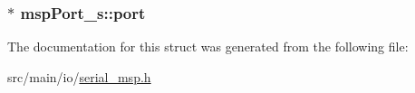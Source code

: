 \hypertarget{structmspPort__s_a561c20f90ff842dbd8a4f75602517a88}{
\subsubsection[{port}]{$\ast$ msp\+Port\+\_\+s\+::port}}\label{structmspPort__s_a561c20f90ff842dbd8a4f75602517a88}


The documentation for this struct was generated from the following file\+:\begin{DoxyCompactItemize}
\item 
src/main/io/\hyperlink{serial__msp_8h}{serial\+\_\+msp.\+h}\end{DoxyCompactItemize}
